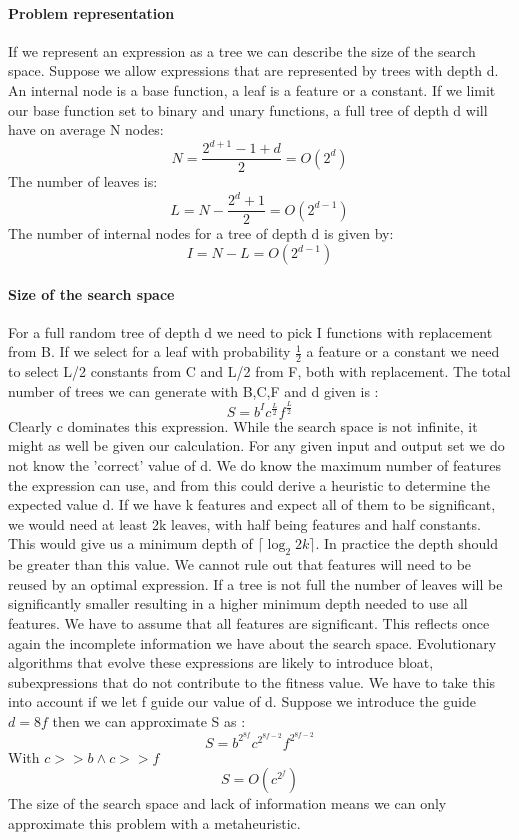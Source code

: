 \paragraph{Problem representation}
If we represent an expression as a tree we can describe the size of the search space. Suppose we allow expressions that are represented by trees with depth d. An internal node is a base function, a leaf is a feature or a constant. If we limit our base function set to binary and unary functions, a full tree of depth d will have on average N nodes:
\[
N = \frac{2^{d+1} - 1 + d}{2} = O(2^d)
\]
The number of leaves is:
\[
L = N - \frac{2^{d} + 1}{2} = O(2^{d-1})
\]
The number of internal nodes for a tree of depth d is given by:
\[
I = N - L = O(2^{d-1})
\]

\paragraph{Size of the search space}\label{searchspace}
For a full random tree of depth d we need to pick I functions with replacement from B.
If we select for a leaf with probability $\frac{1}{2}$ a feature or a constant we need to select L/2 constants from C and L/2 from F, both with replacement.
The total number of trees we can generate with B,C,F and d given is :
\[
S = b^I c^{\frac{L}{2}} f^{\frac{L}{2}}
\]
Clearly c dominates this expression. While the search space is not infinite, it might as well be given our calculation. For any given input and output set we do not know the 'correct' value of d. We do know the maximum number of features the expression can use, and from this could derive a heuristic to determine the expected value d. If we have k features and expect all of them to be significant, we would need at least 2k leaves, with half being features and half constants. This would give us a minimum depth of $\lceil \log_2{2k} \rceil$. In practice the depth should be greater than this value. We cannot rule out that features will need to be reused by an optimal expression. If a tree is not full the number of leaves will be significantly smaller resulting in a higher minimum depth needed to use all features. We have to assume that all features are significant. This reflects once again the incomplete information we have about the search space. Evolutionary algorithms that evolve these expressions are likely to introduce bloat, subexpressions that do not contribute to the fitness value. We have to take this into account if we let f guide our value of d. Suppose we introduce the guide $d = 8 f$ then we can approximate S as :
\[
S = b^{2^{8f}} c^{2^{8f-2}} f^{2^{8f-2}}
\]
With $ c >> b \land c >> f $
\[
S = O(c^{2^f})
\]
The size of the search space and lack of information means we can only approximate this problem with a metaheuristic.

